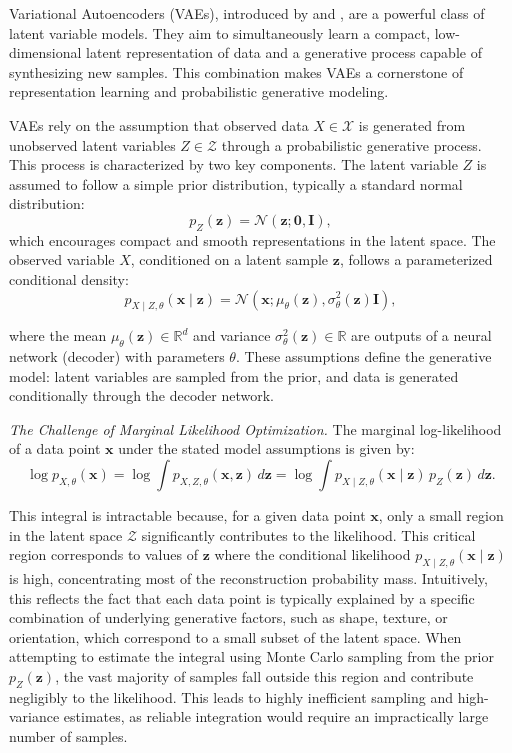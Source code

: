 Variational Autoencoders (VAEs), introduced by \citet{kingma2013auto} and \citet{rezende2014stochastic}, are a powerful class of latent variable models. They aim to simultaneously learn a compact, low-dimensional latent representation of data and a generative process capable of synthesizing new samples. This combination makes VAEs a cornerstone of representation learning and probabilistic generative modeling.

VAEs rely on the assumption that observed data \(X \in \mathcal{X}\) is generated from unobserved latent variables \(Z \in \mathcal{Z}\) through a probabilistic generative process. This process is characterized by two key components. The latent variable \(Z\) is assumed to follow a simple prior distribution, typically a standard normal distribution:
\[
p_{Z}(\mathbf{z}) = \mathcal{N}(\mathbf{z}; \mathbf{0}, \mathbf{I}),
\]
which encourages compact and smooth representations in the latent space. The observed variable \(X\), conditioned on a latent sample \(\mathbf{z}\), follows a parameterized conditional density:
\begin{equation}
p_{X \mid Z, \theta}(\mathbf{x} \mid \mathbf{z}) = \mathcal{N}(\mathbf{x}; \mu_\theta(\mathbf{z}), \sigma_\theta^2(\mathbf{z}) \mathbf{I}),
\end{equation}\label{intro:eq:gaussian_reconstruction}

where the mean \(\mu_\theta(\mathbf{z}) \in \mathbb{R}^d\) and variance \(\sigma_\theta^2(\mathbf{z}) \in \mathbb{R}\) are outputs of a neural network (decoder) with parameters \(\theta\). These assumptions define the generative model: latent variables are sampled from the prior, and data is generated conditionally through the decoder network.

\textit{The Challenge of Marginal Likelihood Optimization.}  
The marginal log-likelihood of a data point \(\mathbf{x}\) under the stated model assumptions is given by:
\[
\log p_{X, \theta}(\mathbf{x}) = \log \int p_{X, Z, \theta}(\mathbf{x}, \mathbf{z}) \, d\mathbf{z} = \log \int p_{X \mid Z, \theta}(\mathbf{x} \mid \mathbf{z}) \, p_{Z}(\mathbf{z}) \, d\mathbf{z}.
\]

This integral is intractable because, for a given data point \(\mathbf{x}\), only a small region in the latent space \(\mathcal{Z}\) significantly contributes to the likelihood. This critical region corresponds to values of \(\mathbf{z}\) where the conditional likelihood \(p_{X \mid Z, \theta}(\mathbf{x} \mid \mathbf{z})\) is high, concentrating most of the reconstruction probability mass. Intuitively, this reflects the fact that each data point is typically explained by a specific combination of underlying generative factors, such as shape, texture, or orientation, which correspond to a small subset of the latent space. When attempting to estimate the integral using Monte Carlo sampling from the prior \(p_Z(\mathbf{z})\), the vast majority of samples fall outside this region and contribute negligibly to the likelihood. This leads to highly inefficient sampling and high-variance estimates, as reliable integration would require an impractically large number of samples.

